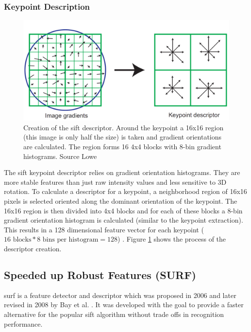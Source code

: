 \subsubsection*{Keypoint Description}
\begin{figure}[ht]
	\centering
	\includegraphics[scale=0.2]{figures/theorySIFT_descriptor}
	\caption{Creation of the \gls{sift} descriptor. Around the keypoint a 16x16 region {(this image is only half the size)} is taken and gradient orientations are calculated. The region forms 16 4x4 blocks with 8-bin gradient histograms. Source Lowe \cite{Lowe2004}}
	\label{fig:siftDescriptor}
\end{figure}
The \gls{sift} keypoint descriptor relies on gradient orientation histograms. They are more stable features than just raw intensity values and less sensitive to 3D rotation. To calculate a descriptor for a keypoint, a neighborhood region of 16x16 pixels is selected oriented along the dominant orientation of the keypoint. The 16x16 region is then divided into 4x4 blocks and for each of these blocks a 8-bin gradient orientation histogram is calculated {(similar to the keypoint extraction)}. This results in a 128 dimensional feature vector for each keypoint {($16\text{ blocks}*8\text{ bins per histogram}=128$)} \cite{Lowe2004}. Figure \ref{fig:siftDescriptor} shows the process of the descriptor creation.

\subsection[SURF]{Speeded up Robust Features (SURF)}
\label{subsec:surf}
\gls{surf} is a feature detector and descriptor which was proposed in 2006 \cite{Bay2006} and later revised in 2008 by Bay et al. \cite{Bay2008}. It was developed with the goal to provide a faster alternative for the popular \gls{sift} algorithm without trade offs in recognition performance.

